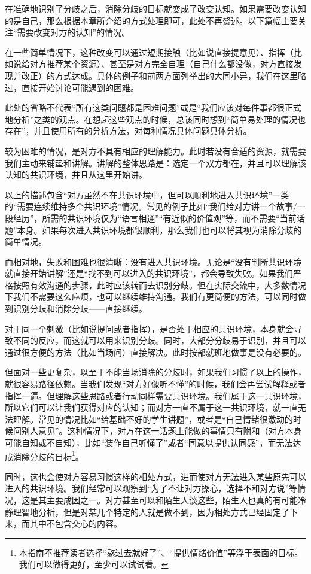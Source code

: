 在准确地识别了分歧之后，消除分歧的目标就变成了改变认知。如果需要改变认知的是自己，那么根据本章所介绍的方式处理即可，此处不再赘述。以下篇幅主要关注“需要改变对方的认知”的情况。
\begin{explain}
在一些简单情况下，这种改变可以通过短期接触（比如说直接提意见）、指挥（比如说给对方推荐某个资源）、甚至是对方完全自理（自己什么都没做，对方直接发现并改正）的方式达成。具体的例子和前两方面列举出的大同小异，我们在这里略过，直接开始讨论可能遇到的困难。

此处的省略不代表“所有这类问题都是困难问题”或是“我们应该对每件事都很正式地分析”之类的观点。在想起这些观点的时候，总该同时想到“简单易处理的情况也存在”，并且使用所有的分析方法，对每种情况具体问题具体分析。
\end{explain}
较为困难的情况，是对方不具有相应的理解能力。此时若没有合适的资源，就需要我们主动来铺垫和讲解。讲解的整体思路是：选定一个双方都在，并且可以理解该认知的共识环境，并且从这里开始讲。
\begin{explain}
以上的描述包含“对方虽然不在共识环境中，但可以顺利地进入共识环境”一类的“需要连续维持多个共识环境”情况。常见的例子比如“我们给对方讲一个故事/一段经历”，所需的共识环境仅为“语言相通”“有近似的价值观”等，而不需要“当前话题”本身。如果每次进入共识环境都很顺利，那么我们也可以将其视为消除分歧的简单情况。

而相对地，失败和困难也很清晰：没有进入共识环境。无论是“没有判断共识环境就直接开始讲解”还是“找不到可以进入的共识环境”，都会导致失败。如果我们严格按照有效沟通的步骤，此时应该转而去识别分歧。但在实际交流中，大多数情况下我们不需要这么麻烦，也可以继续维持沟通。我们有更简便的方法，可以同时做到识别分歧和消除分歧——直接继续。

对于同一个刺激（比如说提问或者指挥），是否处于相应的共识环境，本身就会导致不同的反应，而这就可以用来识别分歧。同时，大部分分歧易于识别，并且可以通过很方便的方法（比如当场问）直接解决。此时按部就班地做事是没有必要的。

但面对一些更复杂，以至于不能当场消除的分歧时，如果我们习惯了以上的操作，就很容易路径依赖。当我们发现“对方好像听不懂”的时候，我们会再尝试解释或者指挥一遍。但理解这些思路或者行动同样需要共识环境。我们属于这一共识环境，所以它们可以让我们获得对应的认知；而对方一直不属于这一共识环境，就一直无法理解。常见的情况比如“给基础不好的学生讲题”，或者是“自己情绪很激动的时候问别人意见”。这种情况下，对方在这一话题上能做的事情只有附和（对方本身可能自知或不自知），比如“装作自己听懂了”或者“同意以提供认同感”，而无法达成消除分歧的目标\footnote{本指南不推荐读者选择“熬过去就好了”、“提供情绪价值”等浮于表面的目标。我们可以做得更好，至少可以试试看。}。

同时，这也会使对方容易习惯这样的相处方式，进而使对方无法进入某些原先可以进入的共识环境。我们经常可以观察到“为了不让对方操心，选择不和对方说”等情况，这是其主要成因之一。对方甚至可以和陌生人谈这些，陌生人也真的有可能冷静理智地分析，但是对某几个特定的人就是做不到，因为相处方式已经固定了下来，而其中不包含交心的内容。
\end{explain}
